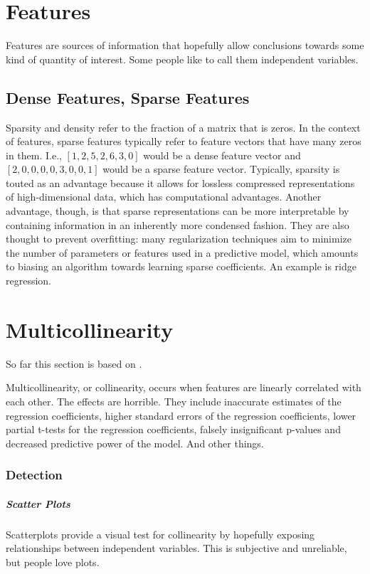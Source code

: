 \section{Features}

Features are sources of information that hopefully allow conclusions towards some kind of quantity of interest. Some people like to call them independent variables.

\subsection{Dense Features, Sparse Features}
Sparsity and density refer to the fraction of a matrix that is zeros. In the context of features, sparse features typically refer to feature vectors that have many zeros in them. I.e., $[1,2,5,2,6,3,0]$ would be a dense feature vector and $[2,0,0,0,0,3,0,0,1]$ would be a sparse feature vector. Typically, sparsity is touted as an advantage because it allows for lossless compressed representations of high-dimensional data, which has computational advantages. Another advantage, though, is that sparse representations can be more interpretable by containing information in an inherently more condensed fashion. They are also thought to prevent overfitting: many regularization techniques aim to minimize the number of parameters or features used in a predictive model, which amounts to biasing an algorithm towards learning sparse coefficients. An example is ridge regression. 

\section{Multicollinearity}
So far this section is based on .

Multicollinearity, or collinearity, occurs when features are linearly correlated with each other. The effects are horrible. They include inaccurate estimates of the regression coefficients, higher standard errors of the regression coefficients, lower partial t-tests for the regression coefficients, falsely insignificant p-values and decreased predictive power of the model. And other things.

\subsubsection{Detection}

\subparagraph{Scatter Plots}
Scatterplots provide a visual test for collinearity by hopefully exposing relationships between independent variables. This is subjective and unreliable, but people love plots.

